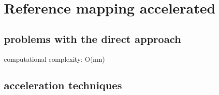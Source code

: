 
\chapter{Reference mapping accelerated}

\section{problems with the direct approach}

computational complexity: O(mn)

\section{acceleration techniques}